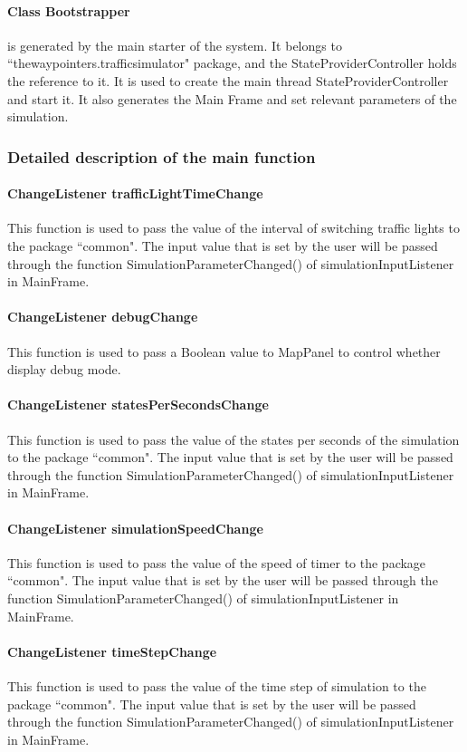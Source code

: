 \documentclass[a4paper,12pt]{article}
\begin{document}
\paragraph{Class Bootstrapper} is generated by the main starter of the system. It belongs to ``thewaypointers.trafficsimulator" package, and the StateProviderController holds the reference to it. It is used to create the main thread StateProviderController and start it. It also generates the Main Frame and set relevant parameters of the simulation.


\subsubsection{Detailed description of the main function}

\paragraph{ChangeListener trafficLightTimeChange} This function is used to pass the value of the interval of switching traffic lights to the package ``common". The input value that is set by the user will be passed through the function SimulationParameterChanged() of simulationInputListener in MainFrame.
\paragraph{ChangeListener debugChange} This function is used to pass a Boolean value to MapPanel to control whether display debug mode.
\paragraph{ChangeListener statesPerSecondsChange} This function is used to pass the value of the states per seconds of the simulation to the package ``common". The input value that is set by the user will be passed through the function SimulationParameterChanged() of simulationInputListener in MainFrame.
\paragraph{ChangeListener simulationSpeedChange} This function is used to pass the value of the speed of timer to the package ``common". The input value that is set by the user will be passed through the function SimulationParameterChanged() of simulationInputListener in MainFrame.
\paragraph{ChangeListener timeStepChange}This function is used to pass the value of the time step of simulation to the package ``common". The input value that is set by the user will be passed through the function SimulationParameterChanged() of simulationInputListener in MainFrame.
\end{document}
